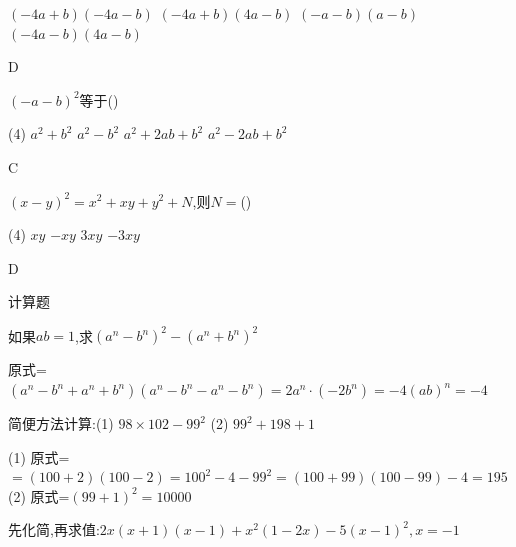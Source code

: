 \documentclass[cn,blue,12pt]{elegantbook}
\begin{document}
\begin{shiti}
\begin{shiti}[resume]
\begin{tasks}
                \task \((-4a+b)(-4a-b)\)
                \task \((-4a+b)(4a-b)\)
                \task \((-a-b)(a-b)\)
                \task \((-4a-b)(4a-b)\)
            \end{tasks}
\begin{solution}
                D\\
\end{solution}
        \item \((-a-b)^2\)等于(\qquad)\\
            \begin{tasks}(4)
                \task \(a^2+b^2\)
                \task \(a^2-b^2\)
                \task \(a^2+2ab+b^2\)
                \task \(a^2-2ab+b^2\)
            \end{tasks}
\begin{solution}
                C\\
\end{solution}
        \item \((x-y)^2=x^2+xy+y^2+N\),则\(N=\)(\qquad)\\
            \begin{tasks}(4)
                \task \(xy\)
                \task \(-xy\)
                \task \(3xy\)
                \task \(-3xy\)
            \end{tasks}
\begin{solution}
                D\\
\end{solution}
        \end{shiti}
    \item 计算题
        \begin{shiti}[resume]
        \item 如果\( ab=1\),求\((a^n-b^n)^2-(a^n+b^n)^2\)
\begin{solution}
                原式=\((a^n-b^n+a^n+b^n)(a^n-b^n-a^n-b^n)=2a^n\cdot (-2b^n)=-4(ab)^n=-4\)\\
\end{solution}
        \item 简便方法计算:(1) \(98 \times 102-99^2\) \qquad (2) \(99^2+198+1\)
\begin{solution}
                (1) 原式=\(=(100+2)(100-2)=100^2-4-99^2=(100+99)(100-99)-4=195\)\\
                (2) 原式=\((99+1)^2=10000\)
\end{solution}
        \item 先化简,再求值:\(2x(x+1)(x-1)+x^2(1-2x)-5(x-1)^2,x=-1\)
\begin{solution}

\end{solution}
\end{shiti}
\end{shiti}
\end{document}

